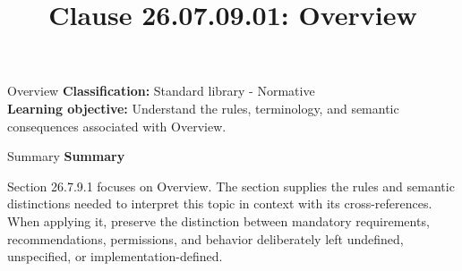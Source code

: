\documentclass[10pt,letterpaper]{article}
\title{Clause 26.07.09.01: Overview}
\author{}
\date{}
\begin{document}
\maketitle
\begin{CornellOverviewBox}{Overview}
\textbf{Classification:} Standard library - Normative\\[2pt]
\textbf{Learning objective:} Understand the rules, terminology, and semantic consequences associated with Overview.
\end{CornellOverviewBox}\begin{CornellSummaryBox}{Summary}
{\sffamily\bfseries\color{Accent} Summary}\par\vspace{3pt}Section 26.7.9.1 focuses on Overview. The section supplies the rules and semantic distinctions needed to interpret this topic in context with its cross-references. When applying it, preserve the distinction between mandatory requirements, recommendations, permissions, and behavior deliberately left undefined, unspecified, or implementation-defined.
\end{CornellSummaryBox}
\end{document}
